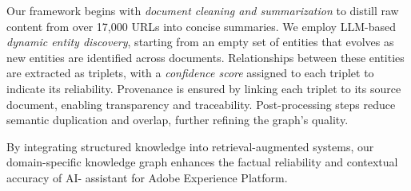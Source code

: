 Our framework begins with \textit{document cleaning and summarization} to distill raw content from over 17,000 URLs into concise summaries. We employ LLM-based \textit{dynamic entity discovery}, starting from an empty set of entities that evolves as new entities are identified across documents. Relationships between these entities are extracted as triplets, with a \textit{confidence score} assigned to each triplet to indicate its reliability. Provenance is ensured by linking each triplet to its source document, enabling transparency and traceability. Post-processing steps reduce semantic duplication and overlap, further refining the graph's quality.  

By integrating structured knowledge into retrieval-augmented systems, our domain-specific knowledge graph enhances the factual reliability and contextual accuracy of AI- assistant for Adobe Experience Platform. 